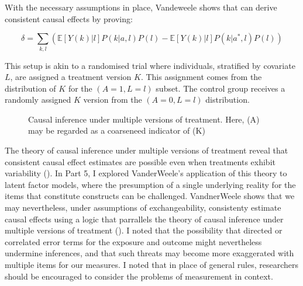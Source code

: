 \documentclass[
  singlecolumn]{article}
\begin{document}
With the necessary assumptions in place, Vandeweele shows that can
derive consistent causal effects by proving:

\[\delta = \sum_{k,l} \left( \mathbb{E}[Y(k)|l] P(k|a,l) P(l) - \mathbb{E}[Y(k)|l] P(k|a^*,l) P(l) \right) \]

This setup is akin to a randomised trial where individuals, stratified
by covariate \(L\), are assigned a treatment version \(K\). This
assignment comes from the distribution of \(K\) for the
\((A = 1, L = l)\) subset. The control group receives a randomly
assigned \(K\) version from the \((A = 0, L = l)\) distribution.

\begin{figure}


\caption{\label{fig-dag\_multiple\_version\_treatment\_dag}Causal
inference under multiple versions of treatment. Here, (A) may be
regarded as a coarseneed indicator of (K)}

\end{figure}%

The theory of causal inference under multiple versions of treatment
reveal that consistent causal effect estimates are possible even when
treatments exhibit variability
(). In Part
5, I explored VanderWeele's application of this theory to latent factor
models, where the presumption of a single underlying reality for the
items that constitute constructs can be challenged. VandnerWeele shows
that we may nevertheless, under assumptions of exchangeability,
consistenty estimate causal effects using a logic that parrallels the
theory of causal inference under multiple versions of treatment
(). I noted that the
possibility that directed or correlated error terms for the exposure and
outcome might nevertheless undermine inferences, and that such threats
may become more exaggerated with multiple items for our measures. I
noted that in place of general rules, researchers should be encouraged
to consider the problems of measurement in context.
\end{document}
